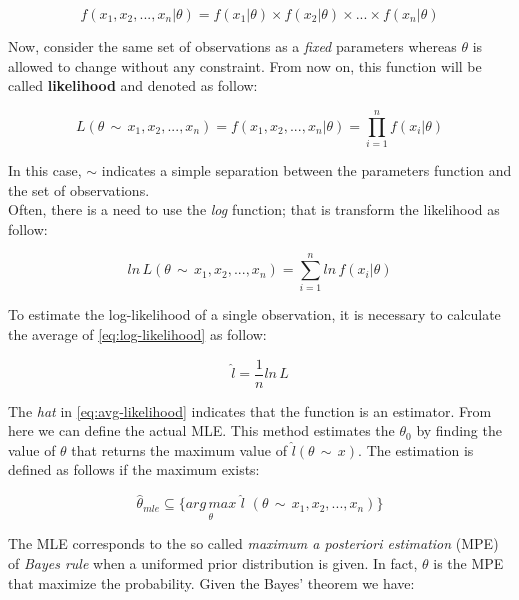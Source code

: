\begin{equation}
	f (x_{1}, x_{2}, ... , x_{n} | \theta) = f(x_{1} | \theta) \times f(x_{2} | \theta) \times ... \times f(x_{n} | \theta)
\end{equation}

\noindent Now, consider the same set of observations as a \textit{fixed} parameters whereas $\theta$ is allowed to change without any constraint. From now on, this function will be called \textbf{likelihood} and denoted as follow:

\begin{equation}
	L(\theta \, \sim \, x_{1}, x_{2}, ... , x_{n}) = f (x_{1}, x_{2}, ... , x_{n} | \theta) = \prod_{i=1}^{n} f (x_{i} | \theta)
\end{equation}

\noindent In this case, $\sim$ indicates a simple separation between the parameters function and the set of observations. \\
\noindent Often, there is a need to use the \textit{log} function; that is transform the likelihood as follow:

\begin{equation}
\label{eq:log-likelihood}
	ln \, L(\theta \, \sim \, x_{1}, x_{2}, ... , x_{n}) = \sum_{i=1}^{n} ln \, f(x_{i} | \theta)
\end{equation}

\noindent To estimate the log-likelihood of a single observation, it is necessary to calculate the average of \ref{eq:log-likelihood} as follow:

\begin{equation}
\label{eq:avg-likelihood}
	\hat{l} = \frac{1}{n} ln \, L
\end{equation}

\noindent The \textit{hat} in \ref{eq:avg-likelihood} indicates that the function is an estimator. From here we can define the actual MLE.
This method estimates the $\theta_{0}$ by finding the value of $\theta$ that returns the maximum value of $\hat{l}(\theta \, \sim \, x)$. The estimation is defined as follows if the maximum exists:

\begin{equation}
	\hat{\theta}_{mle} \subseteq \{ \underset{\theta}{arg \, max} \,\, \hat{l} \,\, (\theta \, \sim \, x_{1}, x_{2}, ... , x_{n})\}
\end{equation}

\noindent The MLE corresponds to the so called \textit{maximum a posteriori estimation} (MPE) of \textit{Bayes rule} when a uniformed prior distribution is given. In fact, $\theta$ is the MPE that maximize the probability. Given the Bayes' theorem we have:

